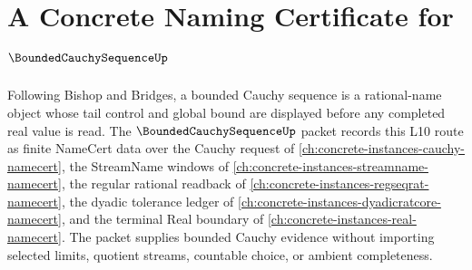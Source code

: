 \chapter{A Concrete Naming Certificate for $\BoundedCauchySequenceUp$}
\label{ch:concrete-instances-bounded-cauchy-sequence-namecert}

Following Bishop and Bridges, a bounded Cauchy sequence is a rational-name object whose tail control and global bound are displayed before any completed real value is read. The $\BoundedCauchySequenceUp$ packet records this L10 route as finite NameCert data over the Cauchy request of \autoref{ch:concrete-instances-cauchy-namecert}, the StreamName windows of \autoref{ch:concrete-instances-streamname-namecert}, the regular rational readback of \autoref{ch:concrete-instances-regseqrat-namecert}, the dyadic tolerance ledger of \autoref{ch:concrete-instances-dyadicratcore-namecert}, and the terminal Real boundary of \autoref{ch:concrete-instances-real-namecert}. The packet supplies bounded Cauchy evidence without importing selected limits, quotient streams, countable choice, or ambient completeness.

